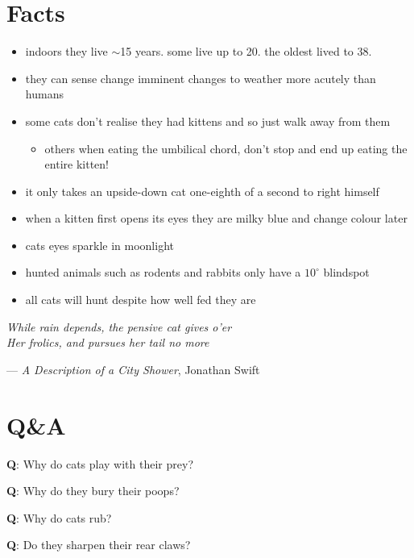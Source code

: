 \documentclass{article}
\begin{document}
\section*{Facts}
\begin{itemize}
    \item indoors they live $\sim$15 years. some live up to 20. the oldest lived to 38.
    \item they can sense change imminent changes to weather more acutely than humans
    \item some cats don't realise they had kittens and so just walk away from them
        \begin{itemize}
            \item others when eating the umbilical chord, don't stop and end up eating the entire kitten!
        \end{itemize}
    \item it only takes an upside-down cat one-eighth of a second to right himself
    \item when a kitten first opens its eyes they are milky blue and change colour later
    \item cats eyes sparkle in moonlight
    \item hunted animals such as rodents and rabbits only have a \(10^\circ\) blindspot
    \item all cats will hunt despite how well fed they are
\end{itemize}

\begin{flushright}
    \begin{minipage}{9cm}
        \flushleft
        \emph{While rain depends, the pensive cat gives o'er\\
            Her frolics, and pursues her tail no more}
    \end{minipage}
    \begin{flushright}--- \emph{A Description of a City Shower}, Jonathan Swift\end{flushright}
\end{flushright}

\section*{Q\&A}
\begin{minipage}{9cm}
    \textbf{Q}: Why do cats play with their prey?
\end{minipage}
\begin{minipage}{9cm}
    \textbf{Q}: Why do they bury their poops?
\end{minipage}
\begin{minipage}{9cm}
    \textbf{Q}: Why do cats rub?
\end{minipage}
\begin{minipage}{9cm}
    \textbf{Q}: Do they sharpen their rear claws?
\end{minipage}
\end{document}
